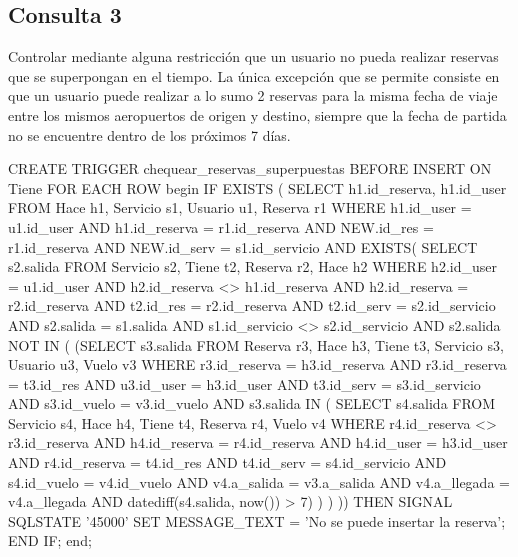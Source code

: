 \begin{small}
\begin{verbatimtab}[2]

\end{verbatimtab}
\end{small}


\newpage

\subsection*{Consulta 3}

Controlar mediante alguna restricción que un usuario no pueda realizar reservas que se
superpongan en el tiempo. La única excepción que se permite consiste en que un usuario
puede realizar a lo sumo 2 reservas para la misma fecha de viaje entre los mismos
aeropuertos de origen y destino, siempre que la fecha de partida no se encuentre dentro de
los próximos 7 días.

\begin{small}
\begin{verbatimtab}[2]
CREATE TRIGGER chequear_reservas_superpuestas
BEFORE INSERT ON Tiene
FOR EACH ROW
begin
	IF EXISTS (
		SELECT h1.id_reserva, h1.id_user
		FROM Hace h1, Servicio s1, Usuario u1, Reserva r1
		WHERE h1.id_user = u1.id_user AND
			h1.id_reserva = r1.id_reserva AND
			NEW.id_res = r1.id_reserva AND
			NEW.id_serv = s1.id_servicio
			AND EXISTS(
			    SELECT s2.salida
			    FROM Servicio s2, Tiene t2, Reserva r2, Hace h2
			    WHERE h2.id_user = u1.id_user
				AND h2.id_reserva <> h1.id_reserva
				AND h2.id_reserva = r2.id_reserva
				AND t2.id_res = r2.id_reserva
				AND t2.id_serv = s2.id_servicio
				AND s2.salida = s1.salida
				AND s1.id_servicio <> s2.id_servicio
				AND s2.salida NOT IN (
					    (SELECT s3.salida
					    FROM Reserva r3, Hace h3, Tiene t3, Servicio s3, Usuario u3, Vuelo v3
					    WHERE r3.id_reserva = h3.id_reserva
						    AND r3.id_reserva = t3.id_res
						    AND u3.id_user = h3.id_user
						    AND t3.id_serv = s3.id_servicio
						    AND s3.id_vuelo = v3.id_vuelo
						    AND s3.salida IN (
								    SELECT s4.salida
								    FROM Servicio s4, Hace h4, Tiene t4, Reserva r4, Vuelo v4
								    WHERE r4.id_reserva <> r3.id_reserva
									    AND h4.id_reserva = r4.id_reserva
									    AND h4.id_user = h3.id_user
									    AND r4.id_reserva = t4.id_res
									    AND t4.id_serv = s4.id_servicio
									    AND s4.id_vuelo = v4.id_vuelo
									    AND v4.a_salida = v3.a_salida
									    AND v4.a_llegada = v4.a_llegada
									    AND datediff(s4.salida, now()) > 7)
								    ) 
							    )
	)) THEN
		SIGNAL SQLSTATE '45000'
			SET MESSAGE_TEXT = 'No se puede insertar la reserva';
	END IF;
end;
\end{verbatimtab}
\end{small}


